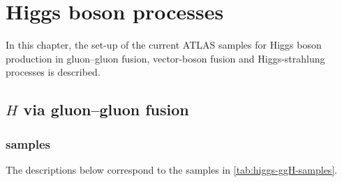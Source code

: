 
\chapter{Higgs boson processes}

In this chapter, the set-up of the current ATLAS samples for Higgs boson production in gluon--gluon fusion,
vector-boson fusion and Higgs-strahlung processes is described.

\section{\(H\) via gluon--gluon fusion}

\subsection*{\texorpdfstring{\POWPY[8]}{Powheg+Pythia8} samples}


The descriptions below correspond to the samples in \cref{tab:higgs-ggH-samples}.

